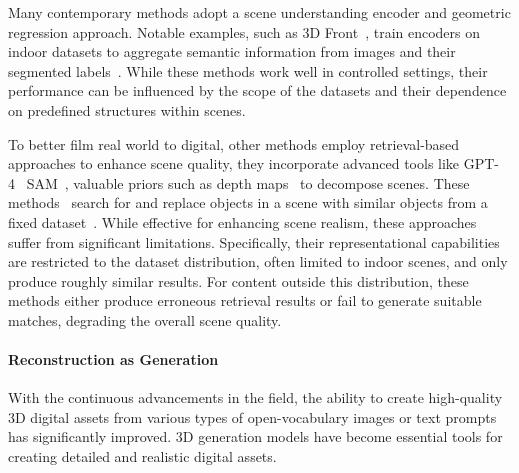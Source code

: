 %
Many contemporary methods adopt a scene understanding encoder and geometric regression approach. Notable examples, such as 3D Front~\cite{fu20213d}, train encoders on indoor datasets to aggregate semantic information from images and their segmented labels~\cite{dahnert2021panoptic,gkioxari2022learning,chu2023buol,chen2024single}.  
While these methods work well in controlled settings, their performance can be influenced by the scope of the datasets and their dependence on predefined structures within scenes.

To better film real world to digital, other methods employ retrieval-based approaches to enhance scene quality, they incorporate advanced tools like GPT-4~\cite{achiam2023gpt} SAM~\cite{kirillov2023segment,ren2024grounded}, valuable priors such as depth maps~\cite{yang2024depth} to decompose scenes.
These methods~\cite{langer2022sparc,gumeli2022roca,kuo2021patch2cad,gao2024diffcad,dai2024automated} search for and replace objects in a scene with similar objects from a fixed dataset~\cite{fu20213d,wu20153d}. While effective for enhancing scene realism, these approaches suffer from significant limitations. Specifically, their representational capabilities are restricted to the dataset distribution, often limited to indoor scenes, and only produce roughly similar results. For content outside this distribution, these methods either produce erroneous retrieval results or fail to generate suitable matches, degrading the overall scene quality.


\paragraph{Reconstruction as Generation}
With the continuous advancements in the field, the ability to create high-quality 3D digital assets from various types of open-vocabulary images or text prompts has significantly improved. 3D generation models have become essential tools for creating detailed and realistic digital assets.


